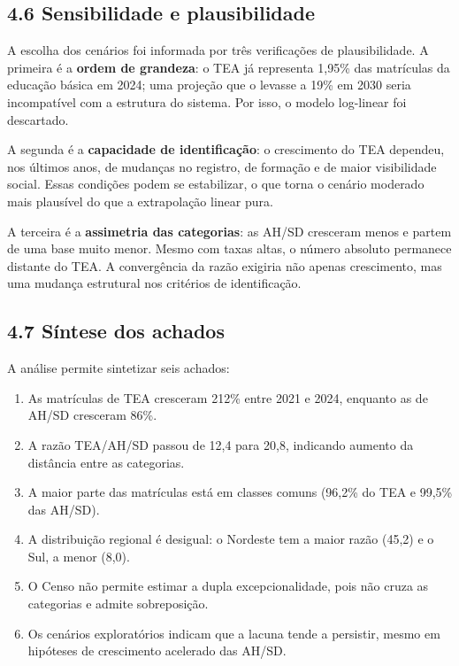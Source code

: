 \subsection{4.6 Sensibilidade e
plausibilidade}\label{sensibilidade-e-plausibilidade}

A escolha dos cenários foi informada por três verificações de
plausibilidade. A primeira é a \textbf{ordem de grandeza}: o TEA já
representa 1,95\% das matrículas da educação básica em 2024; uma
projeção que o levasse a 19\% em 2030 seria incompatível com a estrutura
do sistema. Por isso, o modelo log-linear foi descartado.

A segunda é a \textbf{capacidade de identificação}: o crescimento do TEA
dependeu, nos últimos anos, de mudanças no registro, de formação e de
maior visibilidade social. Essas condições podem se estabilizar, o que
torna o cenário moderado mais plausível do que a extrapolação linear
pura.

A terceira é a \textbf{assimetria das categorias}: as AH/SD cresceram
menos e partem de uma base muito menor. Mesmo com taxas altas, o número
absoluto permanece distante do TEA. A convergência da razão exigiria não
apenas crescimento, mas uma mudança estrutural nos critérios de
identificação.

\subsection{4.7 Síntese dos achados}\label{suxedntese-dos-achados}

A análise permite sintetizar seis achados:

\begin{enumerate}
\def\labelenumi{\arabic{enumi}.}
\tightlist
\item
  As matrículas de TEA cresceram 212\% entre 2021 e 2024, enquanto as de
  AH/SD cresceram 86\%.
\item
  A razão TEA/AH/SD passou de 12,4 para 20,8, indicando aumento da
  distância entre as categorias.
\item
  A maior parte das matrículas está em classes comuns (96,2\% do TEA e
  99,5\% das AH/SD).
\item
  A distribuição regional é desigual: o Nordeste tem a maior razão
  (45,2) e o Sul, a menor (8,0).
\item
  O Censo não permite estimar a dupla excepcionalidade, pois não cruza
  as categorias e admite sobreposição.
\item
  Os cenários exploratórios indicam que a lacuna tende a persistir,
  mesmo em hipóteses de crescimento acelerado das AH/SD.
\end{enumerate}


